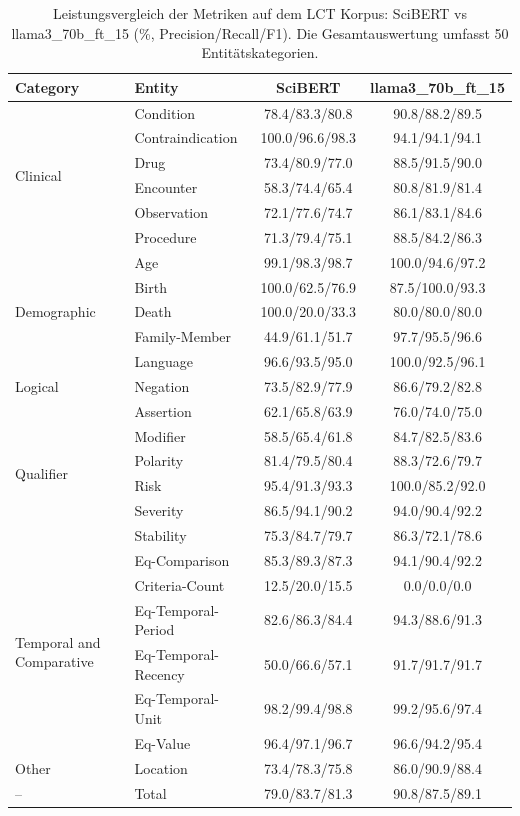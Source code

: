 
\begin{table}[htbp]
\centering
\begin{tabular}{llcc}
\toprule
\textbf{Category} & \textbf{Entity} & \textbf{SciBERT} & \textbf{llama3_70b_ft_15} \\
\midrule
\multirow{6}{*}{Clinical} & Condition & 78.4/83.3/80.8 & 90.8/88.2/89.5 \\
 & Contraindication & 100.0/96.6/98.3 & 94.1/94.1/94.1 \\
 & Drug & 73.4/80.9/77.0 & 88.5/91.5/90.0 \\
 & Encounter & 58.3/74.4/65.4 & 80.8/81.9/81.4 \\
 & Observation & 72.1/77.6/74.7 & 86.1/83.1/84.6 \\
 & Procedure & 71.3/79.4/75.1 & 88.5/84.2/86.3 \\
\midrule
\multirow{5}{*}{Demographic} & Age & 99.1/98.3/98.7 & 100.0/94.6/97.2 \\
 & Birth & 100.0/62.5/76.9 & 87.5/100.0/93.3 \\
 & Death & 100.0/20.0/33.3 & 80.0/80.0/80.0 \\
 & Family-Member & 44.9/61.1/51.7 & 97.7/95.5/96.6 \\
 & Language & 96.6/93.5/95.0 & 100.0/92.5/96.1 \\
\midrule
Logical & Negation & 73.5/82.9/77.9 & 86.6/79.2/82.8 \\
\midrule
\multirow{6}{*}{Qualifier} & Assertion & 62.1/65.8/63.9 & 76.0/74.0/75.0 \\
 & Modifier & 58.5/65.4/61.8 & 84.7/82.5/83.6 \\
 & Polarity & 81.4/79.5/80.4 & 88.3/72.6/79.7 \\
 & Risk & 95.4/91.3/93.3 & 100.0/85.2/92.0 \\
 & Severity & 86.5/94.1/90.2 & 94.0/90.4/92.2 \\
 & Stability & 75.3/84.7/79.7 & 86.3/72.1/78.6 \\
\midrule
\multirow{6}{*}{Temporal and Comparative} & Eq-Comparison & 85.3/89.3/87.3 & 94.1/90.4/92.2 \\
 & Criteria-Count & 12.5/20.0/15.5 & 0.0/0.0/0.0 \\
 & Eq-Temporal-Period & 82.6/86.3/84.4 & 94.3/88.6/91.3 \\
 & Eq-Temporal-Recency & 50.0/66.6/57.1 & 91.7/91.7/91.7 \\
 & Eq-Temporal-Unit & 98.2/99.4/98.8 & 99.2/95.6/97.4 \\
 & Eq-Value & 96.4/97.1/96.7 & 96.6/94.2/95.4 \\
\midrule
Other & Location & 73.4/78.3/75.8 & 86.0/90.9/88.4 \\
\midrule
-- & Total & 79.0/83.7/81.3 & 90.8/87.5/89.1 \\
\bottomrule
\end{tabular}
\caption{Leistungsvergleich der Metriken auf dem LCT Korpus: SciBERT vs llama3_70b_ft_15 (\%, Precision/Recall/F1). Die Gesamtauswertung umfasst 50 Entitätskategorien.}
\label{tab:metrics_comparison}
\end{table}
    